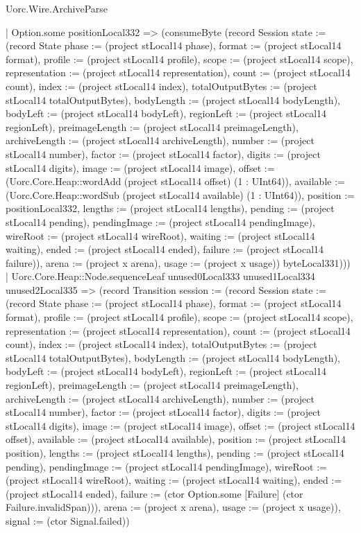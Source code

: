 \begin{lexlean}{Uorc.Wire.ArchiveParse}
\begin{semanticmodule}
{                | Option.some positionLocal332 => (consumeByte (record Session {state := (record State {phase := (project stLocal14 phase), format := (project stLocal14 format), profile := (project stLocal14 profile), scope := (project stLocal14 scope), representation := (project stLocal14 representation), count := (project stLocal14 count), index := (project stLocal14 index), totalOutputBytes := (project stLocal14 totalOutputBytes), bodyLength := (project stLocal14 bodyLength), bodyLeft := (project stLocal14 bodyLeft), regionLeft := (project stLocal14 regionLeft), preimageLength := (project stLocal14 preimageLength), archiveLength := (project stLocal14 archiveLength), number := (project stLocal14 number), factor := (project stLocal14 factor), digits := (project stLocal14 digits), image := (project stLocal14 image), offset := (Uorc.Core.Heap::wordAdd (project stLocal14 offset) (1 : UInt64)), available := (Uorc.Core.Heap::wordSub (project stLocal14 available) (1 : UInt64)), position := positionLocal332, lengths := (project stLocal14 lengths), pending := (project stLocal14 pending), pendingImage := (project stLocal14 pendingImage), wireRoot := (project stLocal14 wireRoot), waiting := (project stLocal14 waiting), ended := (project stLocal14 ended), failure := (project stLocal14 failure)}), arena := (project x arena), usage := (project x usage)}) byteLocal331)))
            | Uorc.Core.Heap::Node.sequenceLeaf unused0Local333 unused1Local334 unused2Local335 => (record Transition {session := (record Session {state := (record State {phase := (project stLocal14 phase), format := (project stLocal14 format), profile := (project stLocal14 profile), scope := (project stLocal14 scope), representation := (project stLocal14 representation), count := (project stLocal14 count), index := (project stLocal14 index), totalOutputBytes := (project stLocal14 totalOutputBytes), bodyLength := (project stLocal14 bodyLength), bodyLeft := (project stLocal14 bodyLeft), regionLeft := (project stLocal14 regionLeft), preimageLength := (project stLocal14 preimageLength), archiveLength := (project stLocal14 archiveLength), number := (project stLocal14 number), factor := (project stLocal14 factor), digits := (project stLocal14 digits), image := (project stLocal14 image), offset := (project stLocal14 offset), available := (project stLocal14 available), position := (project stLocal14 position), lengths := (project stLocal14 lengths), pending := (project stLocal14 pending), pendingImage := (project stLocal14 pendingImage), wireRoot := (project stLocal14 wireRoot), waiting := (project stLocal14 waiting), ended := (project stLocal14 ended), failure := (ctor Option.some [Failure] (ctor Failure.invalidSpan))}), arena := (project x arena), usage := (project x usage)}), signal := (ctor Signal.failed)})
}
\end{semanticmodule}
\end{lexlean}
